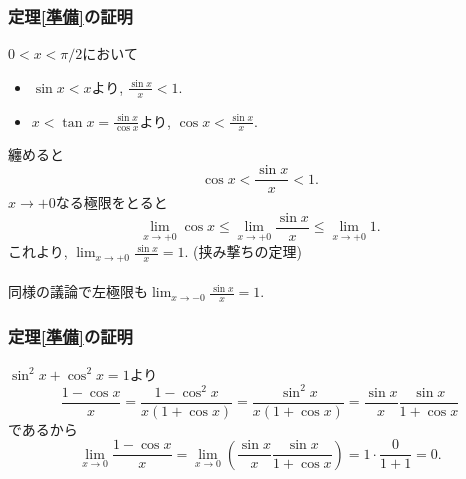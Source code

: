 

\begin{frame}
\frametitle{定理\ref{準備}の証明}

$0<x<\pi/2$において
\begin{itemize}
\item $\sin x < x$より, $\frac{\sin x}{x}<1$. 
\item $x < \tan x=\frac{\sin x}{\cos x}$より, $\cos x < \frac{\sin x}{x}$.   
\end{itemize}
纏めると
$$
\cos x < \frac{\sin x}{x} < 1. 
$$
$x \to +0$なる極限をとると
$$
\lim_{x \to +0} \cos x \le \lim_{x \to +0} \frac{\sin x}{x} \le \lim_{x \to +0} 1. 
$$
これより, $\displaystyle\lim_{x \to +0} \frac{\sin x}{x}=1$. (挟み撃ちの定理)\\
\ \\

同様の議論で左極限も$\displaystyle\lim_{x \to -0} \frac{\sin x}{x}=1$.  

\end{frame}





\begin{frame}
\frametitle{定理\ref{準備}の証明}

$\sin^2x +\cos^2 x=1$より
$$
\frac{1-\cos x}{x}
=
\frac{1-\cos ^2x}{x(1+\cos x)}
=
\frac{\sin ^2x}{x(1+\cos x)}
=
\frac{\sin x}{x}
\frac{\sin x}{1+\cos x}
$$
であるから 
$$
\lim_{x \to 0} \frac{1-\cos x}{x}=
\lim_{x \to 0} (\frac{\sin x}{x}
\frac{\sin x}{1+\cos x})
=1 \cdot \frac{0}{1+1}=0. 
$$

\end{frame}






